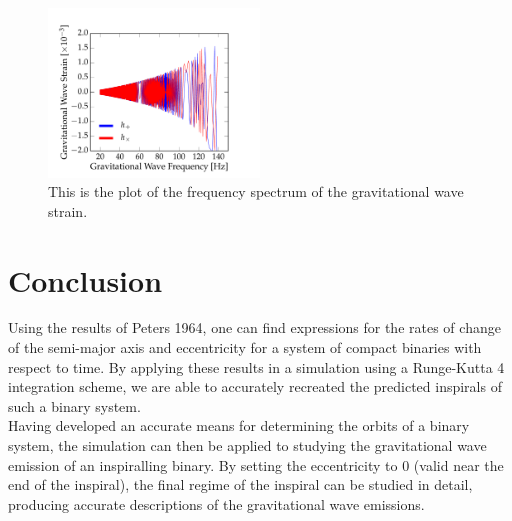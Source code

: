 \documentclass[11pt,letterpaper]{article}
\begin{document}
\begin{figure}[bth]
\centering
\includegraphics[width=0.5\textwidth]{inspiral_figs/inspiral_strain_spectrum.pdf}
\caption{This is the plot of the frequency spectrum of the gravitational wave strain.}
\label{fig:simpleplot2}
\end{figure}

\section{Conclusion}

Using the results of Peters 1964, one can find expressions for the rates of change of the semi-major axis and eccentricity for a system of compact binaries with respect to time. By applying these results in a simulation using a Runge-Kutta 4 integration scheme, we are able to accurately recreated the predicted inspirals of such a binary system. \\

Having developed an accurate means for determining the orbits of a binary system, the simulation can then be applied to studying the gravitational wave emission of an inspiralling binary. By setting the eccentricity to 0 (valid near the end of the inspiral), the final regime of the inspiral can be studied in detail, producing accurate descriptions of the gravitational wave emissions.
\end{document}
